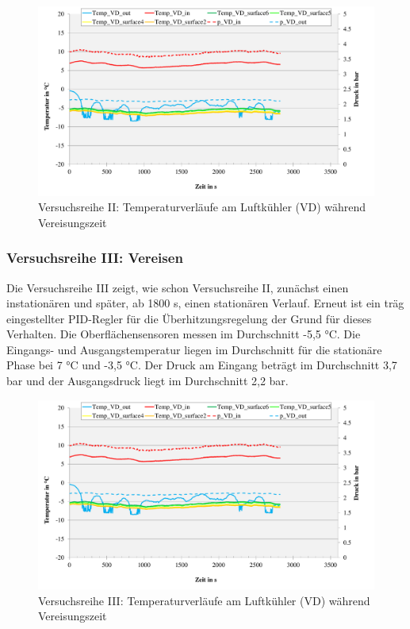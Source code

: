 \begin{figure}[htb]
\centering		\includegraphics[page=2,width=1.08\textwidth]{Pictures/Inbetriebnahme/Abtaumethoden_Tempverlaufe_Vereisen.pdf}
\caption{Versuchsreihe II: Temperaturverläufe am Luftkühler (VD) während Vereisungszeit}
\label{fig:VereisenII}
\end{figure}


\subsubsection*{Versuchsreihe III: Vereisen}

Die Versuchsreihe III zeigt, wie schon Versuchsreihe II, zunächst einen instationären und später, ab 1800 s, einen stationären Verlauf. Erneut ist ein träg eingestellter PID-Regler für die Überhitzungsregelung der Grund für dieses Verhalten. Die Oberflächensensoren messen im Durchschnitt -5,5 °C. Die Eingangs- und Ausgangstemperatur liegen im Durchschnitt für die stationäre Phase bei 7 °C und -3,5 °C. Der Druck am Eingang beträgt im Durchschnitt 3,7 bar und der Ausgangsdruck liegt im Durchschnitt 2,2 bar.  


\begin{figure}[htb]
\centering		\includegraphics[page=3,width=1.08\textwidth]{Pictures/Inbetriebnahme/Abtaumethoden_Tempverlaufe_Vereisen.pdf}
\caption{Versuchsreihe III: Temperaturverläufe am Luftkühler (VD) während Vereisungszeit}
\label{fig:VereisenIII}
\end{figure}


